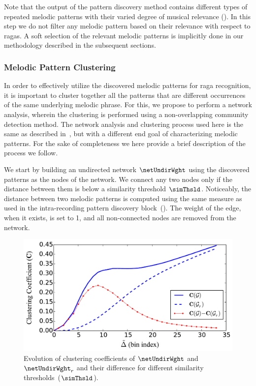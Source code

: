 
Note that the output of the pattern discovery method contains different types of repeated melodic patterns with their varied degree of musical relevance (). In this step we do not filter any melodic pattern based on their relevance with respect to \glspl{raga}. A soft selection of the relevant melodic patterns is implicitly done in our methodology described in the subsequent sections.


\subsubsection{Melodic Pattern Clustering}
\label{sec:vsm_feature_extraction_pattern_clustering}

In order to effectively utilize the discovered melodic patterns for \gls{raga} recognition, it is important to cluster together all the patterns that are different occurrences of the same underlying melodic phrase. For this, we propose to perform a network analysis, wherein the clustering is performed using a non-overlapping community detection method. The network analysis and clustering process used here is the same as described in~, but with a different end goal of characterizing melodic patterns. For the sake of completeness we here provide a brief description of the process we follow.

We start by building an undirected network $\netUndirWght$ using the discovered patterns as the nodes of the network. We connect any two nodes only if the distance between them is below a similarity threshold $\simThsld$. Noticeably, the distance between two melodic patterns is computed using the same measure as used in the intra-recording pattern discovery block~(). The weight of the edge, when it exists, is set to 1, and all non-connected nodes are removed from the network.

\begin{figure}
	\begin{center}
		\includegraphics[width=\figSizeEightyFive]{ch07_ragaRecognition/figures/ClusteringCoffs_40raga_2s.pdf}
	\end{center}
	\caption{Evolution of clustering coefficients of $\netUndirWght$ and $\netUndirWght_r$ and their difference for different similarity thresholds~($\simThsld$).}
	\label{fig:raga_rec_clustering_coff_evolution}
\end{figure}


